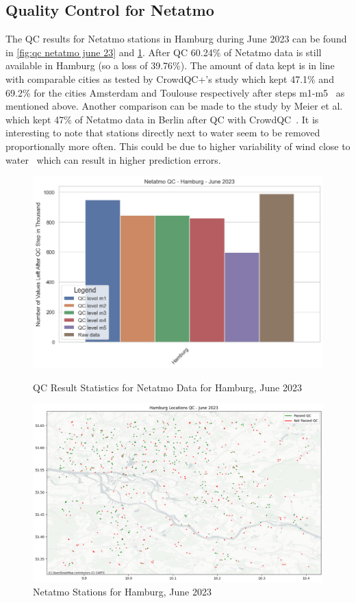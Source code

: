 \subsection{Quality Control for Netatmo}

The QC results for Netatmo stations in Hamburg during June 2023 can be found in \ref{fig:qc netatmo june 23} and \ref{fig:qc netatmo hamburg june 23}.
After QC 60.24\% of Netatmo data is still available in Hamburg (so a loss of 39.76\%). The amount of data kept is in line with comparable cities as tested by CrowdQC+'s study which kept 47.1\% and 69.2\% for the cities Amsterdam and Toulouse respectively after steps m1-m5~\cite{fenner2021crowdqc+} as mentioned above. Another comparison can be made to the study by Meier et al. which kept 47\% of Netatmo data in Berlin after QC with CrowdQC~\cite{meier2017crowdsourcing}.
It is interesting to note that stations directly next to water seem to be removed proportionally more often. This could be due to higher variability of wind close to water~\cite{ho2014mapping} which can result in higher prediction errors.

\begin{figure}[htp]
    \centering
    \includegraphics[width=1\textwidth]{images/netatmo_qc_june_23.png}
    \caption{QC Result Statistics for Netatmo Data for Hamburg, June 2023}
    \label{fig:qc netatmo june 23}

    \includegraphics[width=1\textwidth]{images/netatmo_hamburg_qc_june_23.png}
    \caption{Netatmo Stations for Hamburg, June 2023}
    \label{fig:qc netatmo hamburg june 23}
\end{figure}

